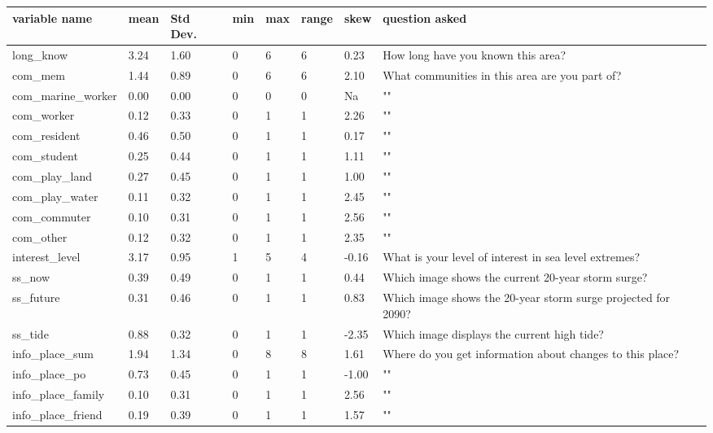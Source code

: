 \documentclass{article}
\begin{document}
\begin{center}
\begin{table}[!ht]
    \centering
    \begin{tabular}{|l|l|l|l|l|l|l|l|}
    \hline
        variable name & mean & Std Dev. & min & max & range & skew & question asked \\ \hline
        long\_know & 3.24 & 1.60 & 0 & 6 & 6 & 0.23 & How long have you known this area? \\ \hline
        com\_mem & 1.44 & 0.89 & 0 & 6 & 6 & 2.10 & What communities in this area are you part of? \\ \hline
        com\_marine\_worker & 0.00 & 0.00 & 0 & 0 & 0 & Na & "" \\ \hline
        com\_worker & 0.12 & 0.33 & 0 & 1 & 1 & 2.26 & "" \\ \hline
        com\_resident & 0.46 & 0.50 & 0 & 1 & 1 & 0.17 & "" \\ \hline
        com\_student & 0.25 & 0.44 & 0 & 1 & 1 & 1.11 & "" \\ \hline
        com\_play\_land & 0.27 & 0.45 & 0 & 1 & 1 & 1.00 & "" \\ \hline
        com\_play\_water & 0.11 & 0.32 & 0 & 1 & 1 & 2.45 & "" \\ \hline
        com\_commuter & 0.10 & 0.31 & 0 & 1 & 1 & 2.56 & "" \\ \hline
        com\_other & 0.12 & 0.32 & 0 & 1 & 1 & 2.35 & "" \\ \hline
        interest\_level & 3.17 & 0.95 & 1 & 5 & 4 & -0.16 & What is your level of interest in sea level extremes? \\ \hline
        ss\_now & 0.39 & 0.49 & 0 & 1 & 1 & 0.44 & Which image shows the current 20-year storm surge? \\ \hline
        ss\_future & 0.31 & 0.46 & 0 & 1 & 1 & 0.83 & Which image shows the 20-year storm surge projected for 2090? \\ \hline
        ss\_tide & 0.88 & 0.32 & 0 & 1 & 1 & -2.35 & Which image displays the current high tide? \\ \hline
        info\_place\_sum & 1.94 & 1.34 & 0 & 8 & 8 & 1.61 & Where do you get information about changes to this place? \\ \hline
        info\_place\_po & 0.73 & 0.45 & 0 & 1 & 1 & -1.00 & "" \\ \hline
        info\_place\_family & 0.10 & 0.31 & 0 & 1 & 1 & 2.56 & "" \\ \hline
        info\_place\_friend & 0.19 & 0.39 & 0 & 1 & 1 & 1.57 & "" \\ \hline

\end{tabular}
\end{table}
\end{center}
\end{document}
